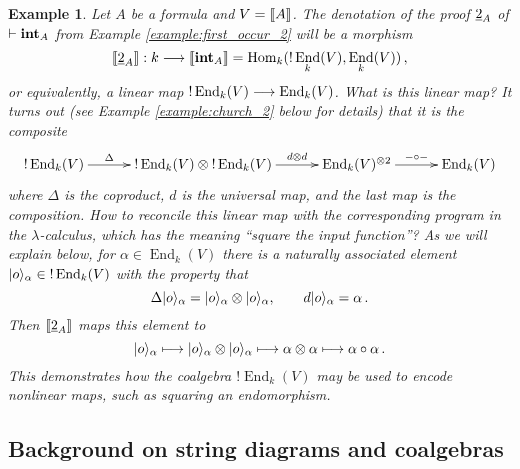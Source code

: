 \documentclass[english,letter paper,12pt,reqno]{article}
\DeclarePairedDelimiter\ket{\lvert}{\rangle}
\theoremstyle{example}
\newtheorem{example}[theorem]{Example}
\numberwithin{equation}{section}
\def\Hom{\operatorname{Hom}}
\DeclareMathOperator{\End}{End}
\def\inta{\bold{int}}
\begin{document}
\begin{example}\label{example:2_denotation_preview} Let $A$ be a formula and $V = \llbracket A \rrbracket$. The denotation of the proof $\underline{2}_A$ of $\vdash \inta_A$ from Example \ref{example:first_occur_2} will be a morphism
\begin{equation}\label{eq:2_as_comp_0}
\den{\church{2}_A}: k \lto \den{\inta_A} = \Hom_k( {!} \End_k(V), \End_k(V) )\,,
\end{equation}
or equivalently, a linear map ${!} \End_k(V) \lto \End_k(V)$. What is this linear map? It turns out (see Example \ref{example:church_2} below for details) that it is the composite
\begin{equation}\label{eq:2_as_comp}
\xymatrix@C+0.5pc{
{!} \End_k(V) \ar[r]^-{\Delta} & {!} \End_k(V) \otimes {!} \End_k(V) \ar[r]^-{d \otimes d} & \End_k(V)^{\otimes 2} \ar[r]^-{- \circ -} & \End_k(V)
}
\end{equation}
where $\Delta$ is the coproduct, $d$ is the universal map, and the last map is the composition. How to reconcile this linear map with the corresponding program in the $\lambda$-calculus, which has the meaning ``square the input function''? As we will explain below, for $\alpha \in \End_k( V )$ there is a naturally associated element $\ket{o}_\alpha \in {!} \End_k(V)$ with the property that
\[
\Delta \ket{o}_\alpha = \ket{o}_\alpha \otimes \ket{o}_\alpha, \qquad d \ket{o}_\alpha = \alpha\,.
\]
Then $\llbracket \underline{2}_A \rrbracket$ maps this element to
\begin{equation}\label{eq:2_deals_with_0}
\ket{o}_\alpha \longmapsto \ket{o}_\alpha \otimes \ket{o}_\alpha \longmapsto \alpha \otimes \alpha \longmapsto \alpha \circ \alpha\,.
\end{equation}
This demonstrates how the coalgebra ${!} \End_k(V)$ may be used to encode nonlinear maps, such as squaring an endomorphism.
\end{example}

\subsection{Background on string diagrams and coalgebras}\label{section:stringdiag}

\end{document}
